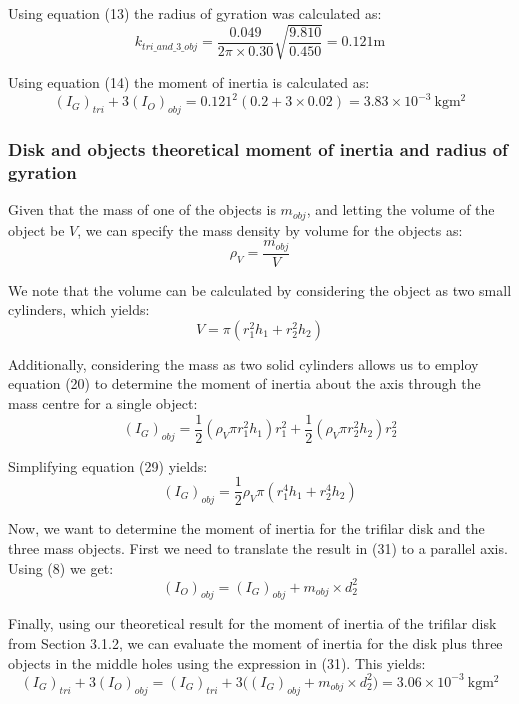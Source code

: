 \documentclass[a4paper]{article}
\begin{document}
Using equation (13) the radius of gyration was calculated as:
\begin{equation}
k_{tri\_and\_3\_obj} = \frac{0.049}{2 \pi \times 0.30}\sqrt{\frac{9.810}{0.450}} = 0.121\si{\meter}
\end{equation}

Using equation (14) the moment of inertia is calculated as:
\begin{equation}
(I_G)_{tri} + 3(I_O)_{obj} = 0.121^2 (0.2 + 3 \times 0.02) = 3.83 \times 10^{-3} \ \si{\kilogram\meter^2}
\end{equation}

\subsubsection{Disk and objects theoretical moment of inertia and radius of gyration}
Given that the mass of one of the objects is $m_{obj}$, and letting the volume of the object be $V$, we can specify the mass density by volume for the objects as:
\begin{equation}
	\rho_V = \frac{m_{obj}}{V}
\end{equation}

We note that the volume can be calculated by considering the object as two small cylinders, which yields:
\begin{equation}
	V = \pi (r_1^2 h_1 + r_2^2 h_2)
\end{equation}

Additionally, considering the mass as two solid cylinders allows us to employ equation (20) to determine the moment of inertia about the axis through the mass centre for a single object:
\begin{equation}
	(I_G)_{obj} = \frac{1}{2} (\rho_V \pi r_1^2 h_1) r_1^2 + \frac{1}{2} (\rho_V \pi r_2^2 h_2) r_2^2 
\end{equation}

Simplifying equation (29) yields:
\begin{equation}
	(I_G)_{obj} = \frac{1}{2} \rho_V \pi (r_1^4 h_1 + r_2^4 h_2)
\end{equation}

Now, we want to determine the moment of inertia for the trifilar disk and the three mass objects. First we need to translate the result in (31) to a parallel axis. Using (8) we get:
\begin{equation}
	(I_O)_{obj} = (I_G)_{obj} + m_{obj} \times d_2^2
\end{equation}

Finally, using our theoretical result for the moment of inertia of the trifilar disk from Section 3.1.2, we can evaluate the moment of inertia for the disk plus three objects in the middle holes using the expression in (31). This yields:
\begin{equation}
	(I_G)_{tri} + 3(I_O)_{obj} = (I_G)_{tri} + 3 \big( (I_G)_{obj} + m_{obj} \times d_2^2 \big) = 3.06 \times 10^{-3} \ \si{\kilogram\meter^2}
\end{equation}
\end{document}
